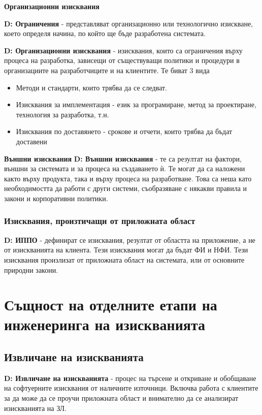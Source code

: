 \documentclass[fleqn,12pt]{article}
\begin{document}
\textbf{Организационни изисквания}

\bigbreak
\textbf{D: Ограничения} - представляват организационно или технологично изискване, което определя начина, по който ще бъде разработена системата.

\bigbreak
\textbf{D: Организационни изисквания} - изисквания, които са ограничения върху процеса на разработка, зависещи от съществуващи политики и процедури в организациите на разработчиците и на клиентите. Те биват 3 вида

\begin{itemize}
	\item Методи и стандарти, които трябва да се следват.
	\item Изисквания за имплементация - език за програмиране, метод за проектиране, технология за разработка, т.н.
	\item Изисквания по доставянето - срокове и отчети, които трябва да бъдат доставени
\end{itemize}

\textbf{Външни изисквания}
\bigbreak
\textbf{D: Външни изисквания} - те са резултат на фактори, външни за системата и за процеса на създаването ѝ. Те могат да са наложени както върху продукта, така и върху процеса на разработване. Това са неша като необходимостта да работи с други системи, съобразяване с някакви правила и закони и корпоративни политики.


\subsubsection{Изисквания, произтичащи от приложната област}
\textbf{D: ИППО} - дефинират се изисквания, резултат от областта на приложение, а не от изискванията на клиента. Тези изисквания могат да бъдат ФИ и НФИ. Тези изисквания произлизат от приложната област на системата, или от основните природни закони.


\section{Същност на отделните етапи на инженеринга на изискванията}

\subsection{Извличане на изискванията}
\textbf{D: Извличане на изискванията} - процес на търсене и откриване и обобщаване на софтуерните изисквания от наличните източници. Включва работа с клиентите за да може да се проучи приложната област и внимателно да се анализират изискванията на ЗЛ.
\end{document}

